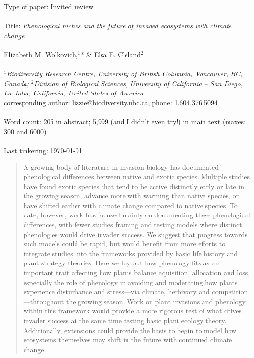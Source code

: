 \documentclass[11pt,a4paper,oneside]{article}
\begin{document}

\noindent Type of paper: Invited review\\
\\
\noindent Title: \emph{Phenological niches and the future of invaded ecosystems with climate change}\\
\\
\noindent Elizabeth M. Wolkovich,$^{1}$* \& Elsa E. Cleland$^{2}$ \\
\\
\noindent \emph{$^{1}$Biodiversity Research Centre, University of British Columbia, Vancouver, BC, Canada; $^{2}$Division of Biological Sciences, University of
  California -- San Diego, La Jolla, California, United States of America.}\\
\noindent *corresponding author: lizzie@biodiversity.ubc.ca, phone: 1.604.376.5094\\
\\
\noindent Word count: 205 in abstract; 5,999 (and I didn't even try!) in main text (maxes: 300 and 6000)\\
\\
\noindent Last tinkering: \today 
\\
\begin{abstract} A growing body of literature in invasion biology has documented phenological differences between native and exotic species. Multiple studies have found exotic species that tend to be active distinctly early or late in the growing season, advance more with warming than native species, or have shifted earlier with climate change compared to native species. To date, however, work has focused mainly on documenting these phenological differences, with fewer studies framing and testing models where distinct phenologies would drive invader success. We suggest that progress towards such models could be rapid, but would benefit from more efforts to integrate studies into the frameworks provided by basic life history and plant strategy theories. Here we lay out how phenology fits as an important trait affecting how plants balance aquisition, allocation and loss, especially the role of phenology in avoiding and moderating how plants experience disturbance and stress---via climate, herbivory and competition---throughout the growing season. Work on plant invasions and phenology within this framework would provide a more rigorous test of what drives invader success at the same time testing basic plant ecology theory. Additionally, extensions could provide the basis to begin to model how ecosystems themselves may shift in the future with continued climate change. 
\end{abstract}
\end{document}
